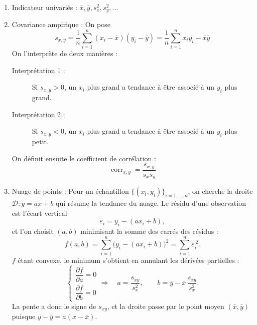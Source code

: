 \begin{enumerate}[label=\arabic*.]
    \item Indicateur univariés : $\bar{x}, \bar{y}, s^2_x, s^2_y, \dots $
    \item Covariance ampirique :
    On pose
    $$
    s_{x,y}= \frac{1}{n}\sum_{i=1}^{n}(x_i-\bar{x})(y_i-\bar{y})= \frac{1}{n} \sum_{i=1}^{n} x_i y_i - \bar{x} \bar{y}
    $$
    On l'interprète de deux manières : 
    \begin{description}
        \item[Interprétation 1 :] Si $s_{x,y} > 0$, un $x_i$ plus grand a tendance à être associé à un $y_i$ plus grand.
        \item[Interprétation 2 :] Si $s_{x,y} < 0$, un $x_i$ plus grand a tendance à être associé à un $y_i$ plus petit.
    \end{description}
    On définit ensuite le coefficient de corrélation :
    $$\operatorname{corr}_{x,y} = \frac{s_{x,y}}{s_x s_y}$$
    \item Nuage de points : 
    Pour un échantillon $\{(x_i,y_i)\}_{i=1,\dots,n}$, on cherche la droite
$\mathcal{D} : y = ax+b$ qui résume la tendance du nuage. Le résidu
d'une observation est l'écart vertical
\[
  \varepsilon_i = y_i - (a x_i + b),
\]
et l'on choisit $(a,b)$ minimisant la somme des carrés des résidus :
\[
  f(a,b) = \sum_{i=1}^{n}\bigl(y_i - (a x_i + b)\bigr)^2
         = \sum_{i=1}^{n}\varepsilon_i^{\,2}.
\]
$f$ étant convexe, le minimum s'obtient en annulant les dérivées
partielles :
\[
  \begin{cases}
    \dfrac{\partial f}{\partial a} = 0\\[2ex]
    \dfrac{\partial f}{\partial b} = 0
  \end{cases}
  \Longrightarrow\quad
  a = \dfrac{s_{xy}}{s_x^{2}},
  \qquad
  b = \bar{y} - \bar{x}\,\dfrac{s_{xy}}{s_x^{2}}.
\]
La pente a donc le signe de $s_{xy}$, et la droite passe par le point
moyen $(\bar{x},\bar{y})$ puisque $y-\bar{y}=a(x-\bar{x})$.
\end{enumerate}

